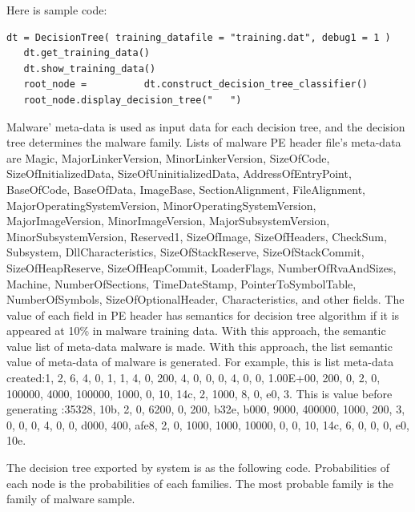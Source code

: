 Here is sample code:
\begin{lstlisting}[caption=Python Implementation of Decision tree 1.5, label=meinLabel]
  dt = DecisionTree( training_datafile = "training.dat", debug1 = 1 )
   dt.get_training_data()
   dt.show_training_data()
   root_node = 		    dt.construct_decision_tree_classifier()
   root_node.display_decision_tree("   ")
\end{lstlisting}

 
Malware' meta-data is used as input data for each decision tree, and the decision tree determines the malware family. Lists of malware PE header file's meta-data are Magic, MajorLinkerVersion, MinorLinkerVersion, SizeOfCode, SizeOfInitializedData, SizeOfUninitializedData, AddressOfEntryPoint, BaseOfCode, BaseOfData, ImageBase, SectionAlignment, FileAlignment, MajorOperatingSystemVersion, MinorOperatingSystemVersion, MajorImageVersion, MinorImageVersion, MajorSubsystemVersion, MinorSubsystemVersion, Reserved1, SizeOfImage, SizeOfHeaders, CheckSum, Subsystem, DllCharacteristics, SizeOfStackReserve, SizeOfStackCommit, SizeOfHeapReserve, SizeOfHeapCommit, LoaderFlags, NumberOfRvaAndSizes, Machine, NumberOfSections, TimeDateStamp, PointerToSymbolTable, NumberOfSymbols, SizeOfOptionalHeader, Characteristics, and other fields. The value of each field in PE header has semantics for decision tree algorithm if it is appeared at 10\% in malware training data. With this approach, the semantic value list of meta-data malware is made. With this approach, the list semantic value of meta-data of malware is generated. For example, this is list meta-data created:1, 2, 6, 4, 0, 1, 1, 4, 0, 200, 4, 0, 0, 0, 4, 0, 0, 1.00E+00, 200, 0, 2, 0, 100000, 4000, 100000, 1000, 0, 10, 14c, 2, 1000, 8, 0, e0, 3. This is value before generating :35328, 10b, 2, 0, 6200, 0, 200, b32e, b000, 9000, 400000, 1000, 200, 3, 0, 0, 0, 4, 0, 0, d000, 400, afe8, 2, 0, 1000, 1000, 10000, 0, 0, 10, 14c, 6, 0, 0, 0, e0, 10e.
 
The decision tree exported by system is as the following code. Probabilities of each node is the probabilities of each families. The most probable family is the family of malware sample.

